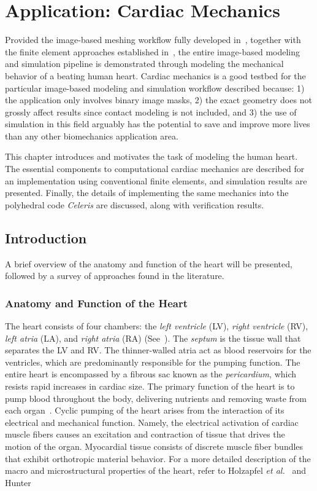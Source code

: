 \chapter{Application: Cardiac Mechanics}
\label{chap:5}
%
Provided the image-based meshing workflow fully developed in~, together with the finite element approaches established in~, the entire image-based modeling and simulation pipeline is demonstrated through modeling the mechanical behavior of a beating human heart. Cardiac mechanics is a good testbed for the particular image-based modeling and simulation workflow described because: 1) the application only involves binary image masks, 2) the exact geometry does not grossly affect results since contact modeling is not included, and 3) the use of simulation in this field arguably has the potential to save and improve more lives than any other biomechanics application area.

This chapter introduces and motivates the task of modeling the human heart. The essential components to computational cardiac mechanics are described for an implementation using conventional finite elements, and  simulation results are presented. Finally, the details of implementing the same mechanics into the polyhedral code \textit{Celeris} are discussed, along with verification results.

\section{Introduction}

A brief overview of the anatomy and function of the heart will be presented, followed by a survey of approaches found in the literature.

\subsection{Anatomy and Function of the Heart}
The heart consists of four chambers: the \textit{left ventricle} (LV), \textit{right ventricle} (RV), \textit{left atria} (LA), and \textit{right atria} (RA) (See~). The \textit{septum} is the tissue wall that separates the LV and RV. The thinner-walled atria act as blood reservoirs for the ventricles, which are predominantly responsible for the pumping function. The entire heart is encompassed by a fibrous sac known as the \textit{pericardium}, which resists rapid increases in cardiac size. The primary function of the heart is to pump blood throughout the body, delivering nutrients and removing waste from each organ~\cite{holzapfel_2009}. Cyclic pumping of the heart arises from the interaction of its electrical and mechanical function. Namely, the electrical activation of cardiac muscle fibers causes an excitation and contraction of tissue that drives the motion of the organ. Myocardial tissue consists of discrete muscle fiber bundles that exhibit orthotropic material behavior. For a more detailed description of the macro and microstructural properties of the heart, refer to Holzapfel \textit{et al.}~\cite{holzapfel_2009} and Hunter~\cite{holzapfel_2009} 

